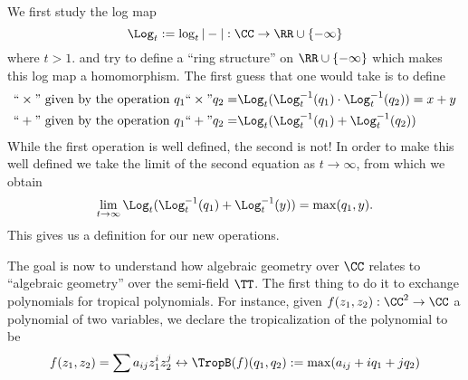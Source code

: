 

We first study the log map 
\[
\Log_t:= \log_t|-|: \CC\to \RR\cup\{-\infty\}
\]
where $t>1$. 
and try to define a ``ring structure'' on $\RR\cup\{-\infty\}$ which makes this log map a homomorphism. 
The first guess that one would take is to define 
\begin{align*}
    ``\times" \text{ given by the operation  } q_1 ``\times" q_2  = &\Log_t(\Log_t^{-1}(q_1) \cdot \Log_t^{-1}(q_2)) = x+y \\
    ``+"    \text{ given by the operation } q_1 ``+" q_2  =    &\Log_t(\Log_t^{-1}(q_1) + \Log_t^{-1}(q_2))
\end{align*}
While the first operation is well defined, the second is not! In order to make this well defined we take the limit of the second equation as $t\to \infty$, from which we obtain 
\[\lim_{t\to\infty} \Log_t(\Log_t^{-1}(q_1) + \Log_t^{-1}(y)) = \max(q_1, y).\]
This gives us a definition for our new operations. 

The goal is now to understand how algebraic geometry over $\CC$ relates to ``algebraic geometry'' over the semi-field $\TT$. The first thing to do it to exchange polynomials for tropical polynomials. For instance, given $f(z_1, z_2): \CC^2\to \CC$ a polynomial of two variables, we declare the tropicalization of the polynomial to be 
\[f(z_1, z_2)=\sum a_{ij} z_1^iz_2^j \leftrightarrow \TropB(f)(q_1, q_2):= \max (a_{ij}+iq_1 + jq_2 )\]

